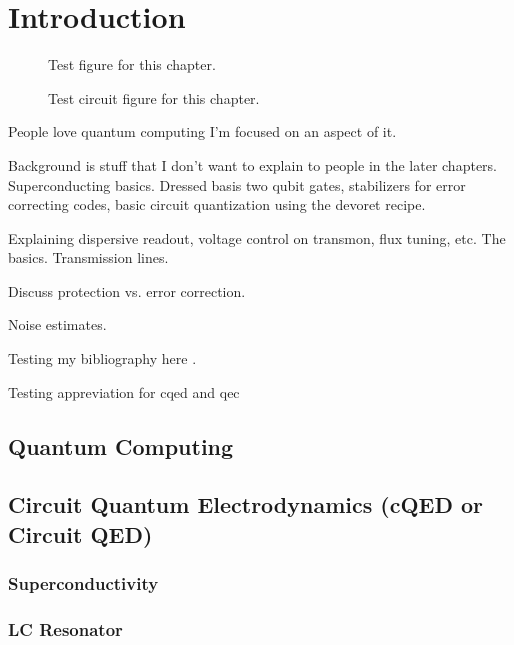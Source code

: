 
\chapter{Introduction} \label{chp:intro}
\begin{figure}[htbp]
    \centering
    
    \caption{Test figure for this chapter.}
\end{figure}
\begin{figure}[htbp]
    \centering
    
    \caption{Test circuit figure for this chapter.}
\end{figure}


People love quantum computing I'm focused on an aspect of it.

Background is stuff that I don't want to explain to people in the later chapters. Superconducting basics. Dressed basis two qubit gates, stabilizers for error correcting codes, basic circuit quantization using the devoret recipe.

Explaining dispersive readout, voltage control on transmon, flux tuning, etc. The basics. Transmission lines.

Discuss protection vs. error correction.

Noise estimates.

Testing my bibliography here \cite{aruteQuantumSupremacyUsing2019a}.

Testing appreviation for \gls{cqed} and \gls{qec}

\section{Quantum Computing}


\section{Circuit Quantum Electrodynamics (cQED or Circuit QED)}

\subsection{Superconductivity}

\subsection{LC Resonator}

